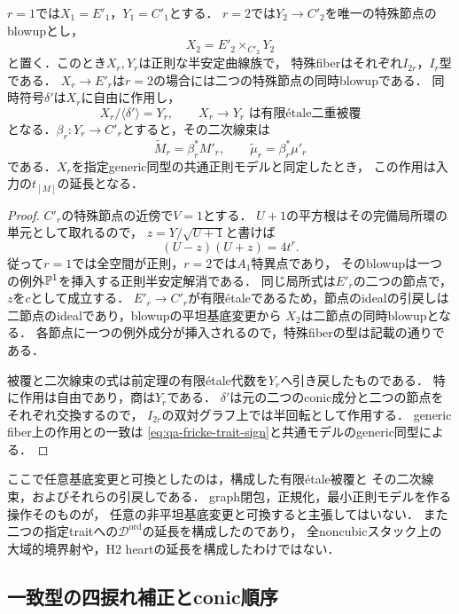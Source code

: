 \begin{proposition}[共通正則モデル上の符号と二次線束]
\label{prop:qa-fricke-regular-quotient-line}
$r=1$では$X_1=E'_1$，$Y_1=C'_1$とする．
$r=2$では$Y_2\to C'_2$を唯一の特殊節点のblowupとし，
\[
 X_2=E'_2\times_{C'_2}Y_2
\]
と置く．このとき$X_r,Y_r$は正則な半安定曲線族で，
特殊fiberはそれぞれ$I_{2r}$，$I_r$型である．
$X_r\to E'_r$は$r=2$の場合には二つの特殊節点の同時blowupである．
同時符号$\delta'$は$X_r$に自由に作用し，
\[
 X_r/\langle\delta'\rangle=Y_r,
 \qquad X_r\to Y_r\text{ は有限\'etale二重被覆}
\]
となる．$\beta_r:Y_r\to C'_r$とすると，その二次線束は
\[
 \widetilde M_r=\beta_r^*M'_r,\qquad
 \widetilde\mu_r=\beta_r^*\mu'_r
\]
である．$X_r$を指定generic同型の共通正則モデルと同定したとき，
この作用は入力の$t_{[M]}$の延長となる．
\end{proposition}
\begin{proof}
$C'_r$の特殊節点の近傍で$V=1$とする．
$U+1$の平方根はその完備局所環の単元として取れるので，
$z=Y/\sqrt{U+1}$と書けば
\[
 (U-z)(U+z)=4t^r.
\]
従って$r=1$では全空間が正則，$r=2$では$A_1$特異点であり，
そのblowupは一つの例外$\mathbb P^1$を挿入する正則半安定解消である．
同じ局所式は$E'_r$の二つの節点で，$z$を$c$として成立する．
$E'_r\to C'_r$が有限\'etaleであるため，節点のidealの引戻しは
二節点のidealであり，blowupの平坦基底変更から
$X_2$は二節点の同時blowupとなる．
各節点に一つの例外成分が挿入されるので，特殊fiberの型は記載の通りである．

被覆と二次線束の式は前定理の有限\'etale代数を$Y_r$へ引き戻したものである．
特に作用は自由であり，商は$Y_r$である．
$\delta'$は元の二つのconic成分と二つの節点をそれぞれ交換するので，
$I_{2r}$の双対グラフ上では半回転として作用する．
generic fiber上の作用との一致は
\eqref{eq:qa-fricke-trait-sign}と共通モデルのgeneric同型による．
\end{proof}

\begin{remark}[基底変更と標識の範囲]
ここで任意基底変更と可換としたのは，構成した有限\'etale被覆と
その二次線束，およびそれらの引戻しである．
graph閉包，正規化，最小正則モデルを作る操作そのものが，
任意の非平坦基底変更と可換すると主張してはいない．
また二つの指定traitへの$\mathscr D^{\mathrm{ord}}$の延長を構成したのであり，
全noncubicスタック上の大域的境界射や，H2 heartの延長を構成したわけではない．
\end{remark}


\subsection{一致型の四捩れ補正とconic順序}

